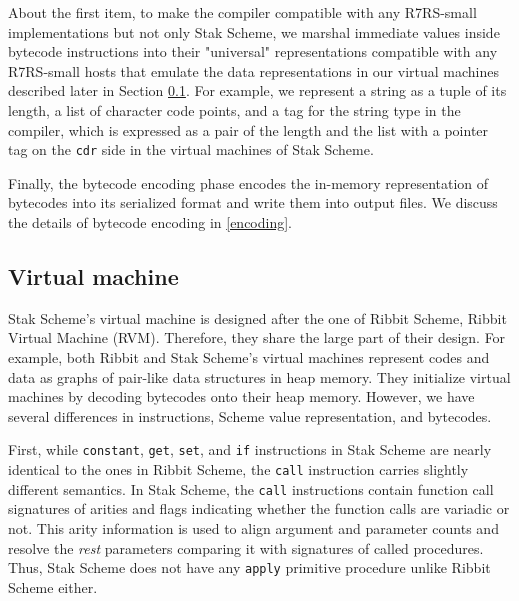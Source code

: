 \documentclass[sigplan, anonymous, review]{acmart}
\begin{document}
About the first item, to make the compiler compatible with any R7RS-small
implementations but not only Stak Scheme, we marshal immediate values
inside bytecode instructions into their "universal"
representations compatible with any R7RS-small hosts that emulate
the data representations in our virtual machines
described later in Section \ref{vm}.
For example, we represent a string as a tuple of its length, a list of
character code points, and a tag for the string type in the compiler,
which is expressed as a pair of the length and the list
with a pointer tag on the \texttt{cdr} side in the virtual
machines of Stak Scheme.

Finally, the bytecode encoding phase encodes the in-memory representation of
bytecodes into its serialized format and write them into output files.
We discuss the details of bytecode encoding in \ref{encoding}.

\subsection{Virtual machine} \label{vm}

Stak Scheme's virtual machine is designed after the one of Ribbit
Scheme, Ribbit Virtual Machine (RVM).
Therefore, they share the large part of their design.
For example, both Ribbit and Stak Scheme's virtual machines represent
codes and data as graphs of pair-like data structures in heap memory.
They initialize virtual machines by decoding bytecodes onto
their heap memory.
However, we have several differences in instructions, Scheme value
representation, and bytecodes.

First, while \texttt{constant}, \texttt{get}, \texttt{set}, and
\texttt{if} instructions in Stak Scheme are nearly identical to the ones in
Ribbit Scheme, the \texttt{call} instruction carries slightly
different semantics.
In Stak Scheme, the \texttt{call} instructions
contain function call signatures of arities and
flags indicating whether the function calls are variadic or not.
This arity information is used to align argument and parameter counts and
resolve the \textit{rest} parameters comparing it with signatures of
called procedures.
Thus, Stak Scheme does not have any \texttt{apply} primitive
procedure unlike Ribbit Scheme either.
\end{document}
